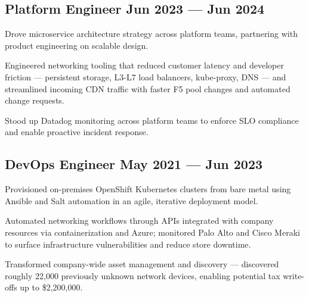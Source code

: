 \documentclass[letter,12pt]{article}
\begin{document}
\subsection{Platform Engineer \hfill Jun 2023 --- Jun 2024}
\begin{zitemize}
\item{Drove microservice architecture strategy across platform teams, partnering with product engineering on scalable design.}
\item{Engineered networking tooling that reduced customer latency and developer friction --- persistent storage, L3-L7 load balancers, kube-proxy, DNS --- and streamlined incoming CDN traffic with faster F5 pool changes and automated change requests.}
\item{Stood up Datadog monitoring across platform teams to enforce SLO compliance and enable proactive incident response.}
\end{zitemize}


\subsection{DevOps Engineer \hfill May 2021 --- Jun 2023}
\begin{zitemize}
\item{Provisioned on-premises OpenShift Kubernetes clusters from bare metal using Ansible and Salt automation in an agile, iterative deployment model.}
\item{Automated networking workflows through APIs integrated with company resources via containerization and Azure; monitored Palo Alto and Cisco Meraki to surface infrastructure vulnerabilities and reduce store downtime.}
\item{Transformed company-wide asset management and discovery --- discovered roughly 22,000 previously unknown network devices, enabling potential tax write-offs up to \$2,200,000.}
\end{zitemize}

\end{document}
